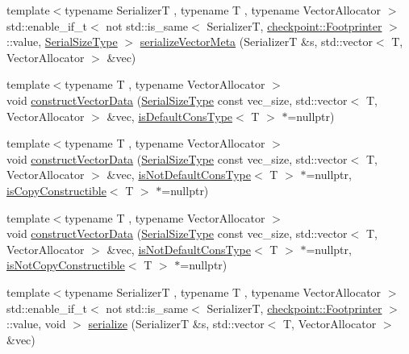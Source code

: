 \begin{DoxyCompactItemize}
\item 
{\footnotesize template$<$typename SerializerT , typename T , typename Vector\+Allocator $>$ }\\std\+::enable\+\_\+if\+\_\+t$<$ not std\+::is\+\_\+same$<$ SerializerT, \hyperlink{structcheckpoint_1_1_footprinter}{checkpoint\+::\+Footprinter} $>$\+::value, \hyperlink{namespacecheckpoint_a083f6674da3f94c2901b18c6d238217c}{Serial\+Size\+Type} $>$ \hyperlink{namespacecheckpoint_a1f197f1929607e9e28b3d33993196729}{serialize\+Vector\+Meta} (SerializerT \&s, std\+::vector$<$ T, Vector\+Allocator $>$ \&vec)
\item 
{\footnotesize template$<$typename T , typename Vector\+Allocator $>$ }\\void \hyperlink{namespacecheckpoint_a74da9a404a365bb8b0e4f387dbccc18c}{construct\+Vector\+Data} (\hyperlink{namespacecheckpoint_a083f6674da3f94c2901b18c6d238217c}{Serial\+Size\+Type} const vec\+\_\+size, std\+::vector$<$ T, Vector\+Allocator $>$ \&vec, \hyperlink{namespacecheckpoint_a58224a3b056d9e2aa73d563871981a7d}{is\+Default\+Cons\+Type}$<$ T $>$ $\ast$=nullptr)
\item 
{\footnotesize template$<$typename T , typename Vector\+Allocator $>$ }\\void \hyperlink{namespacecheckpoint_a07ac5236be7239b0aa42aa419f514062}{construct\+Vector\+Data} (\hyperlink{namespacecheckpoint_a083f6674da3f94c2901b18c6d238217c}{Serial\+Size\+Type} const vec\+\_\+size, std\+::vector$<$ T, Vector\+Allocator $>$ \&vec, \hyperlink{namespacecheckpoint_a4032c86e7c92702198dd675a2696ee2c}{is\+Not\+Default\+Cons\+Type}$<$ T $>$ $\ast$=nullptr, \hyperlink{namespacecheckpoint_a60a9850fa59d4b236b2f888baf135a95}{is\+Copy\+Constructible}$<$ T $>$ $\ast$=nullptr)
\item 
{\footnotesize template$<$typename T , typename Vector\+Allocator $>$ }\\void \hyperlink{namespacecheckpoint_ab21ae06103ddad9d211e21ea8c79b69f}{construct\+Vector\+Data} (\hyperlink{namespacecheckpoint_a083f6674da3f94c2901b18c6d238217c}{Serial\+Size\+Type} const vec\+\_\+size, std\+::vector$<$ T, Vector\+Allocator $>$ \&vec, \hyperlink{namespacecheckpoint_a4032c86e7c92702198dd675a2696ee2c}{is\+Not\+Default\+Cons\+Type}$<$ T $>$ $\ast$=nullptr, \hyperlink{namespacecheckpoint_a141a100f9dcca06fb0b6dbf44a5d6756}{is\+Not\+Copy\+Constructible}$<$ T $>$ $\ast$=nullptr)
\item 
{\footnotesize template$<$typename SerializerT , typename T , typename Vector\+Allocator $>$ }\\std\+::enable\+\_\+if\+\_\+t$<$ not std\+::is\+\_\+same$<$ SerializerT, \hyperlink{structcheckpoint_1_1_footprinter}{checkpoint\+::\+Footprinter} $>$\+::value, void $>$ \hyperlink{namespacecheckpoint_ae9a809c203a65d06dbd99acc82be4844}{serialize} (SerializerT \&s, std\+::vector$<$ T, Vector\+Allocator $>$ \&vec)

\end{DoxyCompactItemize}
